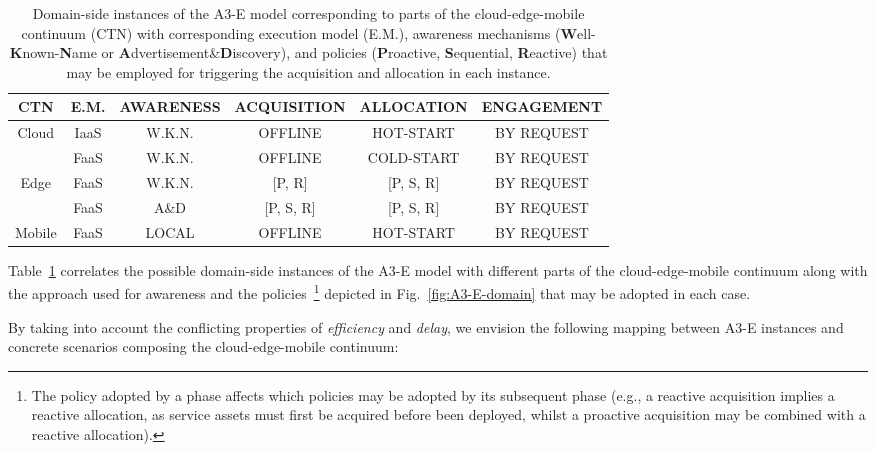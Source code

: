\begin{center}
	\begin{table}[htbp]
		\small
		\caption{Domain-side instances of the A3-E model corresponding to parts of the cloud-edge-mobile continuum (CTN) with corresponding execution model (E.M.), awareness mechanisms (\textbf{W}ell-\textbf{K}nown-\textbf{N}ame or \textbf{A}dvertisement\&\textbf{D}iscovery), and policies (\textbf{P}roactive, \textbf{S}equential, \textbf{R}eactive) that may be employed for triggering the acquisition and allocation in each instance. }\label{tab:A3-E-instances}
		\begin{tabular}{ c c c c c c }
			\toprule
			
			CTN & E.M. & \textbf{A}WARENESS & \textbf{A}CQUISITION	& \textbf{A}LLOCATION 	& \textbf{E}NGAGEMENT  	\\
			
			\midrule
			
			\multirow{2}{*}{ Cloud }
			& IaaS	& W.K.N.	& OFFLINE		& HOT-START	& BY REQUEST\\
			& FaaS		& W.K.N.	& OFFLINE		& COLD-START	& BY REQUEST\\\midrule					
			\multirow{2}{*}{ Edge }
			& FaaS		& W.K.N.	& [P, R]		& [P, S, R] 	& BY REQUEST\\
			& FaaS		& A\&D	& [P, S, R]		& [P, S, R]		& BY REQUEST\\\midrule	
			\multirow{1}{*}{ Mobile }
			& FaaS	& LOCAL  & OFFLINE	& HOT-START 	& BY REQUEST\\
			
			\bottomrule
		\end{tabular}
	\end{table}
\end{center}
\normalsize

Table~\ref{tab:A3-E-instances} correlates the possible domain-side instances of the A3-E model with different parts of the cloud-edge-mobile continuum along with the approach used for awareness and the policies~\footnote{The policy adopted by a phase affects which policies may be adopted by its subsequent phase (e.g., a reactive acquisition implies a reactive allocation, as service assets must first be acquired before been deployed, whilst a proactive acquisition may be combined with a reactive allocation).} depicted in Fig.~\ref{fig:A3-E-domain} that may be adopted in each case. 

By taking into account the conflicting properties of \textit{efficiency} and \textit{delay}, we envision the following mapping between A3-E instances and concrete scenarios composing the cloud-edge-mobile continuum:

